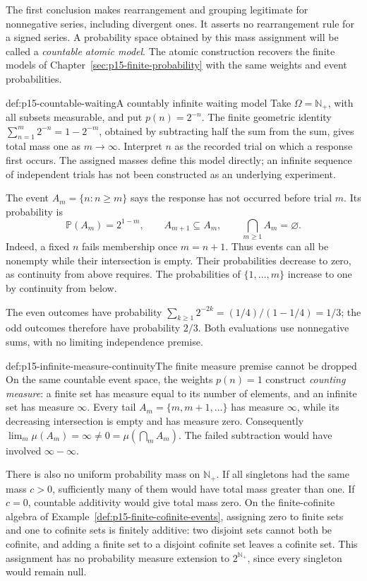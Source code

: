 The first conclusion makes rearrangement and grouping legitimate for
nonnegative series, including divergent ones. It asserts no rearrangement
rule for a signed series. A probability space obtained by this mass
assignment will be called a \emph{countable atomic model}. The atomic
construction recovers the finite
models of Chapter~\ref{sec:p15-finite-probability} with the same weights
and event probabilities.

\begin{hbexample}{def:p15-countable-waiting}{A countably infinite waiting model}
Take \(\Omega=\mathbb N_+\), with all subsets measurable, and put
\(p(n)=2^{-n}\). The finite geometric identity
\(\sum_{n=1}^m2^{-n}=1-2^{-m}\), obtained by subtracting half the sum
from the sum, gives total mass one as \(m\to\infty\).
Interpret \(n\) as the recorded trial on which a response first occurs.
The assigned masses define this model directly; an infinite sequence of
independent trials has not been constructed as an underlying experiment.

The event \(A_m=\{n:n\geq m\}\) says the response has not occurred
before trial \(m\). Its probability is
\[
 \mathbb P(A_m)=2^{1-m},\qquad
 A_{m+1}\subseteq A_m,\qquad \bigcap_{m\geq1}A_m=\varnothing.
\]
Indeed, a fixed \(n\) fails membership once \(m=n+1\). Thus events
can all be nonempty while their intersection is empty. Their probabilities
decrease to zero, as continuity from above requires. The probabilities
of \(\{1,\ldots,m\}\) increase to one by continuity from below.

The even outcomes have probability
\(\sum_{k\geq1}2^{-2k}=(1/4)/(1-1/4)=1/3\); the odd outcomes
therefore have probability \(2/3\). Both evaluations use nonnegative
sums, with no limiting independence premise.
\end{hbexample}

\begin{hbwarning}{def:p15-infinite-measure-continuity}{The finite measure premise cannot be dropped}
On the same countable event space, the weights \(p(n)=1\) construct
\emph{counting measure}: a finite set has measure equal to its number of
elements, and an infinite set has measure \(\infty\). Every tail
\(A_m=\{m,m+1,\ldots\}\) has measure \(\infty\), while its
decreasing intersection is empty and has measure zero. Consequently
\(\lim_m\mu(A_m)=\infty\ne0=\mu(\bigcap_m A_m)\).
The failed subtraction would have involved \(\infty-\infty\).

There is also no uniform probability mass on \(\mathbb N_+\).
If all singletons had the same mass \(c>0\), sufficiently many of them
would have total mass greater than one. If \(c=0\), countable additivity
would give total mass zero. On the finite-cofinite algebra of
Example~\ref{def:p15-finite-cofinite-events}, assigning zero to finite
sets and one to cofinite sets is finitely additive: two disjoint sets
cannot both be cofinite, and adding a finite set to a disjoint cofinite
set leaves a cofinite set. This assignment has no probability measure
extension to \(2^{\mathbb N_+}\), since every singleton would remain null.
\end{hbwarning}

